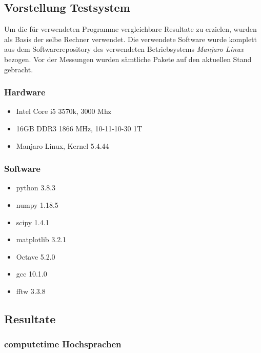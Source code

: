 \documentclass[11pt]{article}
\providecommand{\tightlist}{%
      \setlength{\itemsep}{0pt}\setlength{\parskip}{0pt}}
\begin{document}
\hypertarget{vorstellung-testsystem}{%
\subsection{Vorstellung Testsystem}\label{vorstellung-testsystem}}

Um die für verwendeten Programme vergleichbare Resultate zu erzielen,
wurden als Basis der selbe Rechner verwendet. Die verwendete Software
wurde komplett aus dem Softwarerepository des verwendeten Betriebsystems
\emph{Manjaro Linux} bezogen. Vor der Messungen wurden sämtliche Pakete
auf den aktuellen Stand gebracht.

\hypertarget{hardware}{%
\subsubsection{Hardware}\label{hardware}}

\begin{itemize}
\tightlist
\item
  Intel Core i5 3570k, 3000 Mhz
\item
  16GB DDR3 1866 MHz, 10-11-10-30 1T
\item
  Manjaro Linux, Kernel 5.4.44
\end{itemize}

\hypertarget{software}{%
\subsubsection{Software}\label{software}}

\begin{itemize}
\tightlist
\item
  python 3.8.3
\item
  numpy 1.18.5
\item
  scipy 1.4.1
\item
  matplotlib 3.2.1
\item
  Octave 5.2.0
\item
  gcc 10.1.0
\item
  fftw 3.3.8
\end{itemize}

\hypertarget{resultate}{%
\subsection{Resultate}\label{resultate}}

\hypertarget{computetime-hochsprachen}{%
\subsubsection{computetime
Hochsprachen}\label{computetime-hochsprachen}}
\end{document}
